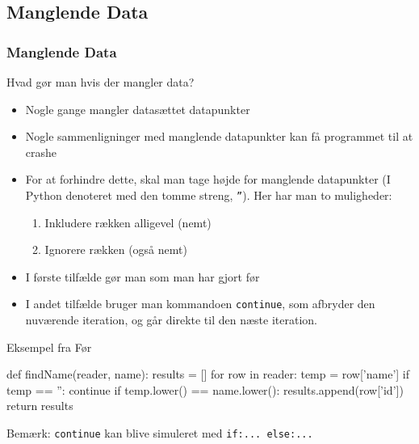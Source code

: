 \documentclass[aspectratio=169,12pt,t]{beamer}
\begin{document}
\subsection{Manglende Data}
\begin{frame}[fragile]
  \frametitle{Manglende Data}
  \vspace*{-14pt}
    \begin{block}{Hvad gør man hvis der mangler data?}
    \begin{itemize}
      \item Nogle gange mangler datasættet datapunkter
      \item Nogle sammenligninger med manglende datapunkter kan få programmet 
            til at crashe
      \item For at forhindre dette, skal man tage højde for manglende 
            datapunkter (I Python denoteret med den tomme streng, {\tt ''}). 
            Her har man to muligheder:
            \begin{enumerate} 
              \item Inkludere rækken alligevel (nemt)
              \item Ignorere rækken (også nemt)
            \end{enumerate}
      \item I første tilfælde gør man som man har gjort før
      \item I andet tilfælde bruger man kommandoen {\tt continue}, som 
            afbryder den nuværende iteration, og går direkte til den næste 
            iteration.
    \end{itemize}
  \end{block}
\end{frame}

\begin{frame}[fragile]
  \begin{block}{Eksempel fra Før}
    \begin{python}
def findName(reader, name):
    results = []
    for row in reader:
        temp = row['name']
        if temp == '':
            continue
        if temp.lower() == name.lower():
            results.append(row['id'])
    return results
    \end{python}
  \end{block}
  \begin{block}{Bemærk:}
    {\tt continue} kan blive simuleret med {\tt if:... else:...}  
  \end{block}
\end{frame}
\end{document}
